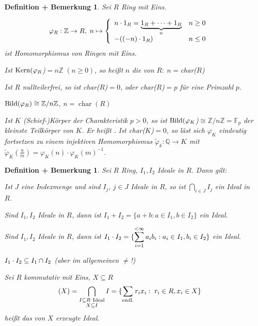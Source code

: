 \documentclass[a4paper,10pt,german]{scrbook}
\theoremstyle{saetze}
\theoremstyle{definitionen}
\newtheorem{DefBem}[Def]{Definition + Bemerkung}
\begin{document}
\begin{DefBem}
Sei $R$ Ring mit Eins.
\begin{enum}
\item \[\varphi_R: \mathbb{Z} \rightarrow R,\; n \mapsto \left\{ \begin{array}{lc}
n \cdot 1_R = \underset{n}{\underbrace{1_R+\dots+1_R}} & n \geq 0 \\
-((-n) \cdot 1_R) & n \leq 0 \end{array} \right.\] ist Homomorphismus von
Ringen mit Eins. %
\item Ist $\mathop{\rm Kern}\nolimits(\varphi_R$)$=n\mathbb{Z}\;(n\geq 0)$, so heißt $n$
die  von $R:\;n =$char($R$)
\item Ist $R$ nullteilerfrei, so ist char($R$)$= 0$, oder
char($R$)$=p$ für eine Primzahl $p$.
\item $\mathop{\rm Bild}\nolimits(\varphi_R) \cong \mathbb Z/n\mathbb Z$, $n=\operatorname{char}(R)$
\item Ist $K$ (Schief-)Körper der Charakteristik $p>0$, so ist
$\mathop{\rm Bild}\nolimits(\varphi_K$)$\cong \mathbb{Z}/n\mathbb{Z} = \mathbb{F}_p$ der
kleinste Teilkörper von $K$. Er heißt . Ist
char($K$)$=0$, so läst sich $\varphi_K$ eindeutig fortsetzen zu einem injektiven Homomorphismus $\tilde \varphi_k:\mathbb Q\to K$ mit $\tilde\varphi_K(\frac nm)=\varphi_K(n)\cdot\varphi_K(m)^{-1}$.
\end{enum}
\end{DefBem}

\begin{DefBem}
Sei $R$ Ring, $I_1, I_2$
Ideale in $R$. Dann gilt:
\begin{enum}
\item Ist $J$ eine Indexmenge und sind $I_j$, $j\in J$ Ideale in $R$, so ist $\bigcap_{i\in J}I_j$ ein Ideal in $R$.
\item Sind $I_1, I_2$ Ideale in $R$, dann ist $I_1 + I_2 = \{a+b:a \in I_1, b\in I_2\}$ ein Ideal.
\item Sind $I_1, I_2$ Ideale in $R$, dann ist $I_1 \cdot I_2 = \{\displaystyle \sum_{i=1}^{<\infty} a_i b_i: a_i \in I_1,
b_i \in I_2 \}$ ein Ideal.
\item $I_1 \cdot I_2 \subseteq I_1 \cap I_2$ (aber im allgemeinen
$\neq$!)
\item Sei $R$ kommutativ mit Eins, $X \subseteq R$
\[(X) = \bigcap_{\substack{I \subseteq R \mbox{ \scriptsize Ideal} \\
X \subseteq I}} I = \{ \sum_{\mbox{\scriptsize endl.}} r_i x_i:\;
r_i \in R, x_i \in X\}\] heißt das von $X$ erzeugte Ideal.
\end{enum}
\end{DefBem}
\end{document}
